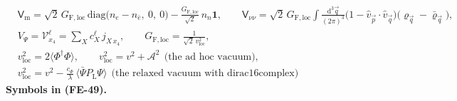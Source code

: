 \documentclass[
  10pt,
]{article}
\begin{document}
\[
\begin{aligned}
&\mathsf{V}_{\mathrm{m}} = \sqrt2\,G_{\mathrm{F,loc}}\,\mathrm{diag}\big(n_e - n_{\bar e},\ 0,\ 0\big) - \frac{G_{\mathrm{F,loc}}}{\sqrt2}\,n_n\mathbf{1},\qquad
 \mathsf{V}_{\nu\nu} = \sqrt2\,G_{\mathrm{F,loc}}\int\frac{\mathrm{d}^3\vec q}{(2\pi)^3}\big(1 - \hat v_{\vec p}\cdot\hat v_{\vec q}\big)\big(\varrho_{\vec q} - \bar\varrho_{\vec q}\big),\\
&V_\Psi = \mathcal{V}^{\ell}_{x_4} = \sum_X c^{\ell}_X\,j_{X\,x_4},\qquad G_{\mathrm{F,loc}} = \frac{1}{\sqrt2\,v_{\mathrm{loc}}^2},\\
&v_{\mathrm{loc}}^2 = 2\langle\Phi^\dagger\Phi\rangle,\qquad v_{\mathrm{loc}}^2 = v^2 + \mathcal{A}^2\ \ \text{(the ad hoc vacuum)},\\
&v_{\mathrm{loc}}^2 = v^2 - \frac{c_\Phi}{\lambda}\,\langle\bar\Psi P_{\mathrm{L}}\Psi\rangle\ \ \text{(the relaxed vacuum with dirac16complex)}
\end{aligned} \tag{FE-49}
\] \textbf{Symbols in (FE-49).}
\end{document}
